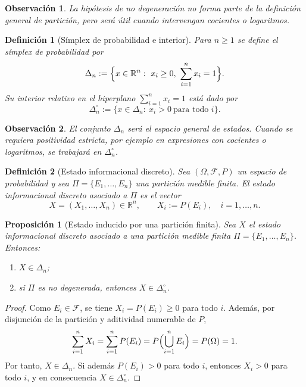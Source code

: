 \documentclass[12pt]{article}
\newtheorem{definicion}{Definición}[section]
\newtheorem{proposicion}{Proposición}[section]
\newtheorem{observacion}{Observación}[section]
\begin{document}
\begin{observacion}
La hipótesis de no degeneración no forma parte de la definición general de partición, pero será útil cuando intervengan cocientes o logaritmos.
\end{observacion}

\begin{definicion}[Símplex de probabilidad e interior]\label{def:simplex}
Para $n\ge 1$ se define el \emph{símplex de probabilidad} por
\[
\Delta_n:=\Bigl\{x\in\mathbb R^n:\ x_i\ge 0,\ \sum_{i=1}^n x_i=1\Bigr\}.
\]
Su interior relativo en el hiperplano $\sum_{i=1}^n x_i=1$ está dado por
\[
\Delta_n^\circ:=\{x\in\Delta_n:\ x_i>0\ \text{para todo } i\}.
\]
\end{definicion}

\begin{observacion}
El conjunto $\Delta_n$ será el espacio general de estados. Cuando se requiera positividad estricta, por ejemplo en expresiones con cocientes o logaritmos, se trabajará en $\Delta_n^\circ$.
\end{observacion}

\begin{definicion}[Estado informacional discreto]\label{def:estado}
Sea $(\Omega,\mathcal F,P)$ un espacio de probabilidad y sea $\Pi=\{E_1,\dots,E_n\}$ una partición medible finita. El \emph{estado informacional discreto} asociado a $\Pi$ es el vector
\[
X=(X_1,\dots,X_n)\in\mathbb R^n,
\qquad
X_i:=P(E_i),\quad i=1,\dots,n.
\]
\end{definicion}

\begin{proposicion}[Estado inducido por una partición finita]\label{prop:estado_simplex}
Sea $X$ el estado informacional discreto asociado a una partición medible finita $\Pi=\{E_1,\dots,E_n\}$.
Entonces:
\begin{enumerate}
    \item $X\in\Delta_n$;
    \item si $\Pi$ es no degenerada, entonces $X\in\Delta_n^\circ$.
\end{enumerate}
\end{proposicion}

\begin{proof}
Como $E_i\in\mathcal F$, se tiene $X_i=P(E_i)\ge 0$ para todo $i$. Además, por disjunción de la partición y aditividad numerable de $P$,
\[
\sum_{i=1}^n X_i
=
\sum_{i=1}^n P(E_i)
=
P\Bigl(\bigcup_{i=1}^n E_i\Bigr)
=
P(\Omega)
=
1.
\]
Por tanto, $X\in\Delta_n$. Si además $P(E_i)>0$ para todo $i$, entonces $X_i>0$ para todo $i$, y en consecuencia $X\in\Delta_n^\circ$.
\end{proof}
\end{document}
